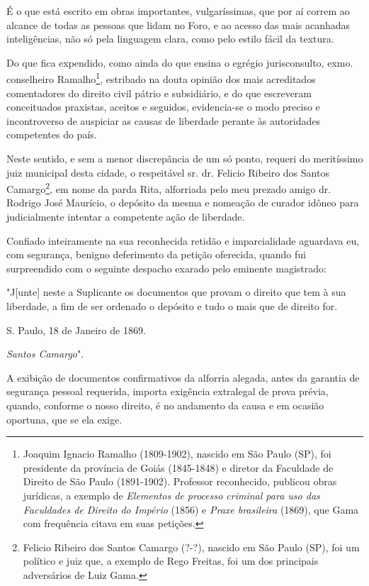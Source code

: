 É o que está escrito em obras importantes, vulgaríssimas, que por aí
correm ao alcance de todas as pessoas que lidam no Foro, e ao acesso das
mais acanhadas inteligências, não só pela linguagem clara, como pelo
estilo fácil da textura.

Do que fica expendido, como ainda do que ensina o egrégio jurisconsulto,
exmo. conselheiro Ramalho\footnote{Joaquim Ignacio Ramalho
  (1809-1902), nascido em São Paulo (SP), foi presidente da província de
  Goiás (1845-1848) e diretor da Faculdade de Direito de São Paulo
  (1891-1902). Professor reconhecido, publicou obras jurídicas, a
  exemplo de \emph{Elementos de processo criminal para uso das
  Faculdades de Direito do Império} (1856) e \emph{Praxe brasileira}
  (1869), que Gama com frequência citava em suas petições.}, estribado
na douta opinião dos mais acreditados comentadores do direito civil
pátrio e subsidiário, e do que escreveram conceituados praxistas,
aceitos e seguidos, evidencia-se o modo preciso e incontroverso de
auspiciar as causas de liberdade perante às autoridades competentes do
país.

Neste sentido, e sem a menor discrepância de um só ponto, requeri do
meritíssimo juiz municipal desta cidade, o respeitável sr. dr. Felicio
Ribeiro dos Santos Camargo\footnote{Felicio Ribeiro dos Santos Camargo
  (?-?), nascido em São Paulo (SP), foi um político e juiz que, a
  exemplo de Rego Freitas, foi um dos principais adversários de Luiz
  Gama.}, em nome da parda Rita, alforriada pelo meu prezado amigo dr.
Rodrigo José Maurício, o depósito da mesma e nomeação de curador idôneo
para judicialmente intentar a competente ação de liberdade.

Confiado inteiramente na sua reconhecida retidão e imparcialidade
aguardava eu, com segurança, benigno deferimento da petição oferecida,
quando fui surpreendido com o seguinte despacho exarado pelo eminente
magistrado:

"J{[}unte{]} neste a Suplicante os documentos que provam o direito que
tem à sua liberdade, a fim de ser ordenado o depósito e tudo o mais que
de direito for.

S. Paulo, 18 de Janeiro de 1869.

\emph{Santos Camargo}".

A exibição de documentos confirmativos da alforria alegada, antes da
garantia de segurança pessoal requerida, importa exigência extralegal de
prova prévia, quando, conforme o nosso direito, é no andamento da causa
e em ocasião oportuna, que se ela exige.

